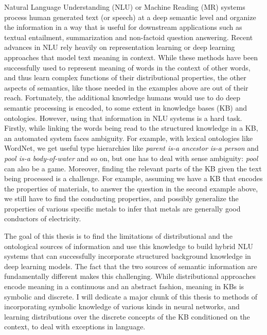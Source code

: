 Natural Language Understanding (NLU) or Machine Reading (MR) systems process human generated text 
(or speech) at a deep semantic level and organize the information in a way that
is useful for 
downstream applications such as textual entailment, summarization and
non-factoid question answering. 
Recent advances in NLU rely heavily on representation learning or deep learning
approaches that model 
text meaning in context. While these methods have been successfully used to represent meaning
of words in the context of other words, and thus learn complex functions of their distributional
properties, the other aspects of semantics, like those needed in the examples above are out of their reach.
Fortunately, the additional knowledge humans would use to do deep semantic processing is encoded, to
some extent in knowledge bases (KB) and ontologies. However, using that information in NLU systems is a 
hard task. Firstly, while linking the words being read to the structured knowledge
in a KB, an automated system faces ambiguity. For example, with lexical ontologies like WordNet, 
we get useful type hierarchies like \textit{parent is-a ancestor is-a person} and \textit{pool is-a body-of-water} 
and so on, but one has to deal with sense ambiguity: \textit{pool} can also be a game. Moreover, finding the 
relevant parts of the KB given the text being processed is a challenge. For example, assuming we have a KB that encodes
the properties of materials, to answer the question in the second example above, we still have to 
find the conducting properties, and possibly generalize the properties of various specific metals to
infer that metals are generally good conductors of electricity.


The goal of this thesis is to find the limitations of distributional and the ontological 
sources of information and use this knowledge to build hybrid NLU systems that can successfully 
incorporate structured background knowledge in deep learning models. The fact
that the two sources of semantic information are fundamentally different 
makes this challenging. While distributional approaches encode meaning in a
continuous and an abstract fashion, meaning in KBs is symbolic and discrete. 
I will dedicate a major chunk of this thesis to methods of incorporating
symbolic knowledge of various kinds in neural networks, and learning 
distributions over the discrete concepts of the KB conditioned on the context,
to deal with exceptions in language.


